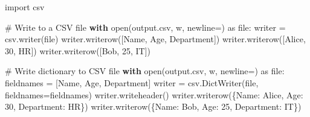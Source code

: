 \documentclass[
  letterpaper,
  DIV=11,
  numbers=noendperiod]{scrreprt}
\newenvironment{Shaded}{\begin{snugshade}}{\end{snugshade}}
\newcommand{\BuiltInTok}[1]{\textcolor[rgb]{0.00,0.23,0.31}{#1}}
\newcommand{\CommentTok}[1]{\textcolor[rgb]{0.37,0.37,0.37}{#1}}
\newcommand{\ControlFlowTok}[1]{\textcolor[rgb]{0.00,0.23,0.31}{\textbf{#1}}}
\newcommand{\ImportTok}[1]{\textcolor[rgb]{0.00,0.46,0.62}{#1}}
\newcommand{\NormalTok}[1]{\textcolor[rgb]{0.00,0.23,0.31}{#1}}
\newcommand{\OperatorTok}[1]{\textcolor[rgb]{0.37,0.37,0.37}{#1}}
\newcommand{\StringTok}[1]{\textcolor[rgb]{0.13,0.47,0.30}{#1}}
\begin{document}
\begin{Shaded}
\begin{Highlighting}[]
\ImportTok{import}\NormalTok{ csv}

\CommentTok{\# Write to a CSV file}
\ControlFlowTok{with} \BuiltInTok{open}\NormalTok{(}\StringTok{\textquotesingle{}output.csv\textquotesingle{}}\NormalTok{, }\StringTok{\textquotesingle{}w\textquotesingle{}}\NormalTok{, newline}\OperatorTok{=}\StringTok{\textquotesingle{}\textquotesingle{}}\NormalTok{) }\ImportTok{as} \BuiltInTok{file}\NormalTok{:}
\NormalTok{    writer }\OperatorTok{=}\NormalTok{ csv.writer(}\BuiltInTok{file}\NormalTok{)}
\NormalTok{    writer.writerow([}\StringTok{\textquotesingle{}Name\textquotesingle{}}\NormalTok{, }\StringTok{\textquotesingle{}Age\textquotesingle{}}\NormalTok{, }\StringTok{\textquotesingle{}Department\textquotesingle{}}\NormalTok{])}
\NormalTok{    writer.writerow([}\StringTok{\textquotesingle{}Alice\textquotesingle{}}\NormalTok{, }\StringTok{\textquotesingle{}30\textquotesingle{}}\NormalTok{, }\StringTok{\textquotesingle{}HR\textquotesingle{}}\NormalTok{])}
\NormalTok{    writer.writerow([}\StringTok{\textquotesingle{}Bob\textquotesingle{}}\NormalTok{, }\StringTok{\textquotesingle{}25\textquotesingle{}}\NormalTok{, }\StringTok{\textquotesingle{}IT\textquotesingle{}}\NormalTok{])}

\CommentTok{\# Write dictionary to CSV file}
\ControlFlowTok{with} \BuiltInTok{open}\NormalTok{(}\StringTok{\textquotesingle{}output.csv\textquotesingle{}}\NormalTok{, }\StringTok{\textquotesingle{}w\textquotesingle{}}\NormalTok{, newline}\OperatorTok{=}\StringTok{\textquotesingle{}\textquotesingle{}}\NormalTok{) }\ImportTok{as} \BuiltInTok{file}\NormalTok{:}
\NormalTok{    fieldnames }\OperatorTok{=}\NormalTok{ [}\StringTok{\textquotesingle{}Name\textquotesingle{}}\NormalTok{, }\StringTok{\textquotesingle{}Age\textquotesingle{}}\NormalTok{, }\StringTok{\textquotesingle{}Department\textquotesingle{}}\NormalTok{]}
\NormalTok{    writer }\OperatorTok{=}\NormalTok{ csv.DictWriter(}\BuiltInTok{file}\NormalTok{, fieldnames}\OperatorTok{=}\NormalTok{fieldnames)}
\NormalTok{    writer.writeheader()}
\NormalTok{    writer.writerow(\{}\StringTok{\textquotesingle{}Name\textquotesingle{}}\NormalTok{: }\StringTok{\textquotesingle{}Alice\textquotesingle{}}\NormalTok{, }\StringTok{\textquotesingle{}Age\textquotesingle{}}\NormalTok{: }\StringTok{\textquotesingle{}30\textquotesingle{}}\NormalTok{, }\StringTok{\textquotesingle{}Department\textquotesingle{}}\NormalTok{: }\StringTok{\textquotesingle{}HR\textquotesingle{}}\NormalTok{\})}
\NormalTok{    writer.writerow(\{}\StringTok{\textquotesingle{}Name\textquotesingle{}}\NormalTok{: }\StringTok{\textquotesingle{}Bob\textquotesingle{}}\NormalTok{, }\StringTok{\textquotesingle{}Age\textquotesingle{}}\NormalTok{: }\StringTok{\textquotesingle{}25\textquotesingle{}}\NormalTok{, }\StringTok{\textquotesingle{}Department\textquotesingle{}}\NormalTok{: }\StringTok{\textquotesingle{}IT\textquotesingle{}}\NormalTok{\})}
\end{Highlighting}
\end{Shaded}
\end{document}
